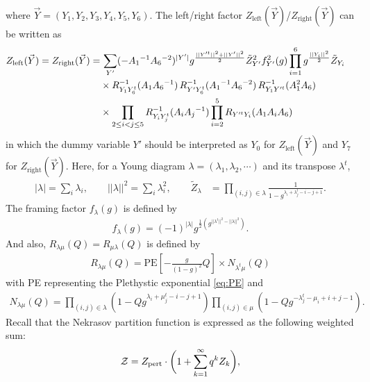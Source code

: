 \documentclass[letterpaper, 11pt]{article}
\def\CZ{{\cal Z}}
\begin{document}
{\begin{align}
\end{align}
where $\vec{Y}=(Y_1, Y_2, Y_3, Y_4, Y_5, Y_6)$. The left/right factor 
$Z_{\text{left}}(\vec{Y})$/$Z_{\text{right}}(\vec{Y})$ can be written as 
\begin{align}
\begin{split}
Z_{\text{left}}(\vec{Y}) = Z_{\text{right}}(\vec{Y})=& \,
\sum_{Y'} ( - A_1{}^{-1} A_6{}^{-2})^{|Y'|} 
g^{\frac{||Y'^t||^2+||Y'||^2}{2}} \tilde{Z}_{Y'}^2 f_{Y'}^2(g)
\prod_{i=1}^6 g^{\frac{||Y_i||^2}{2}} \tilde{Z}_{Y_i} 
\cr 
& 
\times 
R_{Y_1 Y_6^t}^{-1} (A_1 A_6{}^{-1})\,R_{Y' Y_6^t}^{-1} (A_1{}^{-1} A_6{}^{-2})\,R_{Y_1Y'^t }^{-1} (A_1^2A_6) \cr 
& 
\times  
 \prod_{2 \le i <  j \le 5} R_{Y_i Y_j^t}^{-1} (A_i A_j{}^{-1})
 \prod_{i=2}^5 R_{Y'^t Y_i} (A_1 A_i  A_6) 
\end{split}
\end{align}
in which the dummy variable $Y'$ should be interpreted as $Y_0$ for $Z_{\text{left}}(\vec{Y})$ and  $Y_7$ for $Z_{\text{right}}(\vec{Y})$. %
Here, for a Young diagram $\lambda = (\lambda_1, \lambda_2, \cdots)$ and its transpose $\lambda^t$,  
\begin{align}
  |\lambda|=\sum_{i}\lambda_i, \qquad ||\lambda||^2 =\sum_{i}\lambda_i^2, \qquad  \tilde{Z}_{\lambda} 
&= \prod_{(i,j) \in \lambda} \frac{1}{1 - g^{\lambda_i + \lambda^t_j - i - j +1} }. 	
\end{align}
The framing factor $f_{\lambda}(g)$ is defined by
\begin{align}
f_\lambda(g) = (-1)^{|\lambda|}g^{\frac{1}{2}(g^{||\lambda^t||^2 - ||\lambda||^2})}.
\end{align}
And also, $R_{\lambda \mu } (Q)=R_{\mu \lambda} (Q)$ is defined by
\begin{align}
R_{\lambda \mu } (Q)%
=\text{PE} \left[ - \frac{g}{(1-g)^2} Q \right]
\times N_{\lambda^t \mu} (Q)
\end{align}
with PE representing the Plethystic exponential \eqref{eq:PE}
 and 
\begin{align}
N_{\lambda \mu} (Q) 
= \prod_{(i,j) \in \lambda} \left( 1 - Q g^{\lambda_i + \mu_j^t -i-j+1} \right)
\prod_{(i,j) \in \mu} \left( 1 - Q g^{-\lambda^t_j - \mu_i + i + j - 1} \right). 
\end{align}
Recall that the Nekrasov partition function is expressed as the following weighted sum: 
\begin{align}
\CZ = Z_{\text{pert}} \cdot \bigg(1 + \sum_{k=1}^{\infty}q^kZ_k\bigg) ,

\end{align}}
\end{document}
